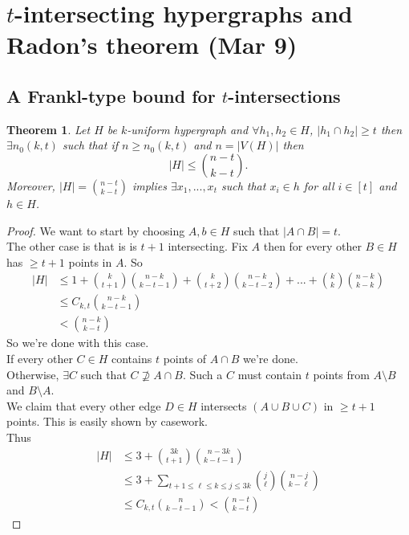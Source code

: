 \documentclass[a4paper]{article}
\newtheorem{thm}{Theorem}[section]
\begin{document}
\section{$t$-intersecting hypergraphs and Radon's theorem (Mar 9)}

\subsection{A Frankl-type bound for $t$-intersections}

\begin{thm}
    Let $H$ be $k$-uniform hypergraph and $\forall h_1,h_2\in H$, $|h_1\cap h_2|\geq t$ then $\exists n_0(k,t)$ such that if $n\geq n_0(k,t)$ and $n=|V(H)|$ then 
    \[
    |H|\leq {n-t \choose k-t}
    .\] 
    Moreover, $|H|={n-t \choose k-t}$ implies $\exists x_1,...,x_t$ such that $x_i \in h$ for all $i\in[t]$ and $h\in H$. 
\end{thm}
\begin{proof}
    We want to start by choosing $A,b\in H$ such that $|A\cap B|=t$. \\
    The other case is that is is $t+1$ intersecting. Fix $A$ then for every other $B\in H$ has $\geq t+1$ points in $A$. So 
    \begin{align*}
        |H|&\leq 1+{k \choose t+1}{n-k \choose k-t-1}+{k \choose t+2}{n-k \choose k-t-2}+...+{k \choose k}{n-k \choose k-k}\\&
        \leq C_{k,t}{n-k \choose k-t-1}\\
        &<{n-k \choose k-t}
    \end{align*}
    So we're done with this case. \\
    If every other $C\in H$ contains $t$ points of $A\cap B$ we're done. \\
    Otherwise, $\exists C$ such that $C\not \supseteq A\cap B$. Such a $C$ must contain $t$ points from $A\setminus B$ and $B\setminus A$. \\
    We claim that every other edge $D\in H$ intersects $(A\cup B \cup C)$ in $\geq t+1$ points. This is easily shown by casework. \\
    Thus 
    \begin{align*}
        |H|&\leq 3 + {3k \choose t+1}{n-3k \choose k-t-1}\\
        &\leq 3+\sum_{t+1\leq \ell \leq k \leq j \leq 3k}{j \choose \ell}{n-j \choose k-\ell}\\
        &\leq C_{k,t}{n \choose k-t-1}<{n-t \choose k-t}
    \end{align*}
\end{proof}
\end{document}
